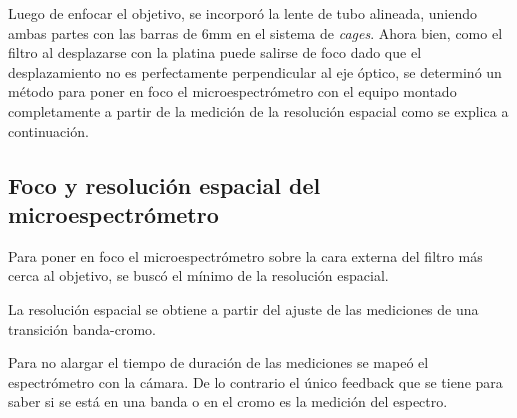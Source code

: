 \begin{figure}[H]
\begin{floatrow}
	\end{floatrow}
\end{figure}

Luego de enfocar el objetivo, se incorporó la lente de tubo alineada, uniendo ambas partes con las barras de 6mm en el sistema de \textit{cages}. Ahora bien, como el filtro al desplazarse con la platina puede salirse de foco dado que el desplazamiento no es perfectamente perpendicular al eje óptico, se determinó un método para poner en foco el microespectrómetro con el equipo montado completamente a partir de la medición de la resolución espacial como se explica a continuación.


\singlespacing
\subsection{Foco y resolución espacial del microespectrómetro}
\label{sec:focoresol}

\hspace{0.5cm}

Para poner en foco el microespectrómetro sobre la cara externa del filtro más cerca al objetivo, se buscó el mínimo de la resolución espacial.

La resolución espacial se obtiene a partir del ajuste de las mediciones de una transición banda-cromo.

Para no alargar el tiempo de duración de las mediciones se mapeó el espectrómetro con la cámara. De lo contrario el único feedback que se tiene para saber si se está en una banda o en el cromo es la medición del espectro.

